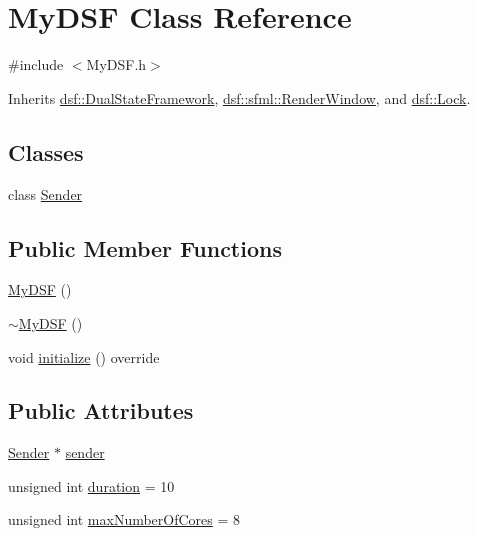 \hypertarget{class_my_d_s_f}{}\section{My\+D\+S\+F Class Reference}
\label{class_my_d_s_f}


{\ttfamily \#include $<$My\+D\+S\+F.\+h$>$}



Inherits \hyperlink{classdsf_1_1_dual_state_framework}{dsf\+::\+Dual\+State\+Framework}, \hyperlink{classdsf_1_1sfml_1_1_render_window}{dsf\+::sfml\+::\+Render\+Window}, and \hyperlink{classdsf_1_1_lock}{dsf\+::\+Lock}.

\subsection*{Classes}
\begin{DoxyCompactItemize}
\item 
class \hyperlink{class_my_d_s_f_1_1_sender}{Sender}
\end{DoxyCompactItemize}
\subsection*{Public Member Functions}
\begin{DoxyCompactItemize}
\item 
\hyperlink{class_my_d_s_f_a7a674c56832e56804ef3f529b5ea8873}{My\+D\+S\+F} ()
\item 
\hyperlink{class_my_d_s_f_a045f1ee7aab3f5259e93da63646d2265}{$\sim$\+My\+D\+S\+F} ()
\item 
void \hyperlink{class_my_d_s_f_aadd27ab33c6958abe2ed4c507e6e5dae}{initialize} () override
\end{DoxyCompactItemize}
\subsection*{Public Attributes}
\begin{DoxyCompactItemize}
\item 
\hyperlink{class_my_d_s_f_1_1_sender}{Sender} $\ast$ \hyperlink{class_my_d_s_f_a0c9939346f14a4e8542a22bc5e17bd7a}{sender}
\item 
unsigned int \hyperlink{class_my_d_s_f_a5216506e3952579bd83ebcf77013df15}{duration} = 10
\item 
unsigned int \hyperlink{class_my_d_s_f_a3ca13f96cce426bc99251a5b27616e16}{max\+Number\+Of\+Cores} = 8
\end{DoxyCompactItemize}
